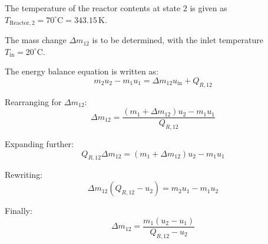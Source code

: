 The temperature of the reactor contents at state 2 is given as \( T_{\text{Reactor},2} = 70^\circ\text{C} = 343.15 \, \text{K} \).  

The mass change \( \Delta m_{12} \) is to be determined, with the inlet temperature \( T_{\text{in}} = 20^\circ\text{C} \).  

The energy balance equation is written as:  
\[
m_2 u_2 - m_1 u_1 = \Delta m_{12} u_{\text{in}} + Q_{R,12}
\]  

Rearranging for \( \Delta m_{12} \):  
\[
\Delta m_{12} = \frac{(m_1 + \Delta m_{12}) u_2 - m_1 u_1}{Q_{R,12}}
\]  

Expanding further:  
\[
Q_{R,12} \Delta m_{12} = (m_1 + \Delta m_{12}) u_2 - m_1 u_1
\]  

Rewriting:  
\[
\Delta m_{12} (Q_{R,12} - u_2) = m_2 u_1 - m_1 u_2
\]  

Finally:  
\[
\Delta m_{12} = \frac{m_1 (u_2 - u_1)}{Q_{R,12} - u_2}
\]